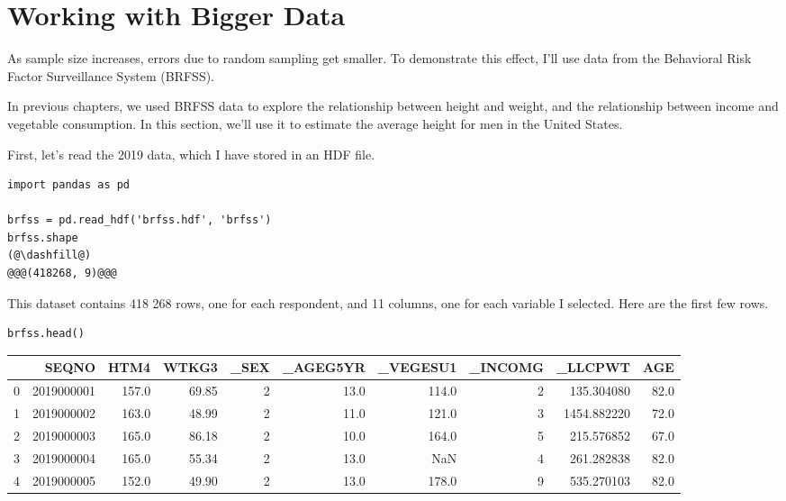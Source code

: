 \hypertarget{working-with-bigger-data}{%
\section{Working with Bigger Data}\label{working-with-bigger-data}}

As sample size increases, errors due to random sampling get smaller. To
demonstrate this effect, I'll use data from the Behavioral Risk Factor
Surveillance System (BRFSS).

In previous chapters, we used BRFSS data to explore the relationship
between height and weight, and the relationship between income and
vegetable consumption. In this section, we'll use it to estimate the
average height for men in the United States.

First, let's read the 2019 data, which I have stored in an HDF file.

\begin{lstlisting}[]
import pandas as pd

brfss = pd.read_hdf('brfss.hdf', 'brfss')
brfss.shape
(@\dashfill@)
@@@(418268, 9)@@@
\end{lstlisting}

This dataset contains 418 268 rows, one for each respondent, and 11
columns, one for each variable I selected. Here are the first few rows.

\begin{lstlisting}[]
brfss.head()
\end{lstlisting}

\begin{tabular}{lrrrrrrrrr}
\midrule
{} &       SEQNO &   HTM4 &  WTKG3 &  \_SEX &  \_AGEG5YR &  \_VEGESU1 &  \_INCOMG &      \_LLCPWT &   AGE \\
\midrule
0 &  2019000001 &  157.0 &  69.85 &     2 &      13.0 &     114.0 &        2 &   135.304080 &  82.0 \\
1 &  2019000002 &  163.0 &  48.99 &     2 &      11.0 &     121.0 &        3 &  1454.882220 &  72.0 \\
2 &  2019000003 &  165.0 &  86.18 &     2 &      10.0 &     164.0 &        5 &   215.576852 &  67.0 \\
3 &  2019000004 &  165.0 &  55.34 &     2 &      13.0 &       NaN &        4 &   261.282838 &  82.0 \\
4 &  2019000005 &  152.0 &  49.90 &     2 &      13.0 &     178.0 &        9 &   535.270103 &  82.0 \\
\midrule
\end{tabular}

